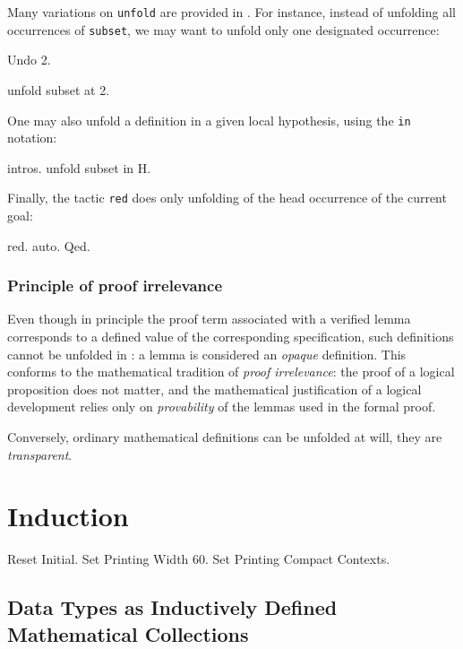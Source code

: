 \documentclass[11pt,a4paper]{book}
\begin{document}
Many variations on \verb:unfold: are provided in \Coq. For instance,
instead of unfolding all occurrences of \verb:subset:, we may want to
unfold only one designated occurrence:
\begin{coq_eval}
Undo 2.
\end{coq_eval}
\begin{coq_example}
unfold subset at 2.
\end{coq_example}

One may also unfold a definition in a given local hypothesis, using the
\verb:in: notation:
\begin{coq_example}
intros.
unfold subset in H.
\end{coq_example}

Finally, the tactic \verb:red: does only unfolding of the head occurrence
of the current goal:
\begin{coq_example}
red.
auto.
Qed.
\end{coq_example}


\subsection{Principle of proof irrelevance}

Even though in principle the proof term associated with a verified lemma
corresponds to a defined value of the corresponding specification, such
definitions cannot be unfolded in \Coq: a lemma is considered an {\sl opaque}
definition. This conforms to the mathematical tradition of {\sl proof
irrelevance}: the proof of a logical proposition does not matter, and the
mathematical justification of a logical development relies only on
{\sl provability} of the lemmas used in the formal proof. 

Conversely, ordinary mathematical definitions can be unfolded at will, they
are {\sl transparent}. 

\chapter{Induction}

\begin{coq_eval}
Reset Initial.
Set Printing Width 60.
Set Printing Compact Contexts.
\end{coq_eval}

\section{Data Types as Inductively Defined Mathematical Collections}
\end{document}

